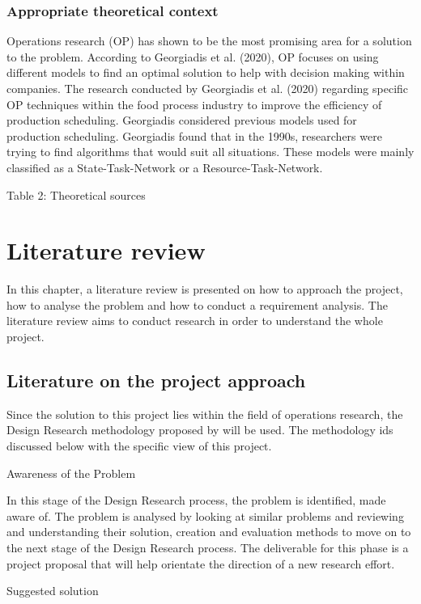 \documentclass[a4paper,11pt,fleqn]{report}
\begin{document}
        \subsection{Appropriate theoretical context}
            Operations research (OP) has shown to be the most promising area for a solution to the problem. According to Georgiadis et al. (2020), OP focuses on using different models to find an optimal solution to help with decision making within companies. The research conducted by Georgiadis et al. (2020) regarding specific OP techniques within the food process industry to improve the efficiency of production scheduling. Georgiadis considered previous models used for production scheduling. Georgiadis found that in the 1990s, researchers were trying to find algorithms that would suit all situations. These models were mainly classified as a State-Task-Network or a Resource-Task-Network.
            
            Table 2: Theoretical sources
\chapter{Literature review}
\acresetall

In this chapter, a literature review is presented on how to approach the project, how to analyse the problem and how to conduct a requirement analysis. The literature review aims to conduct research in order to understand the whole project.

    \section{Literature on the project approach}
        Since the solution to this project lies within the field of operations research, the Design Research methodology proposed by \citep{Manson2006} will be used. The methodology ids discussed below with the specific view of this project.
        
        Awareness of the Problem
        
            In this stage of the Design Research process, the problem is identified, made aware of. The problem is analysed by looking at similar problems and reviewing and understanding their solution, creation and evaluation methods to move on to the next stage of the Design Research process. The deliverable for this phase is a project proposal that will help orientate the direction of a new research effort.
            
        Suggested solution
        
\end{document}
